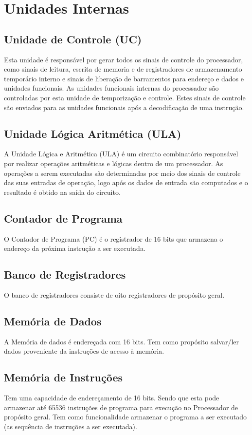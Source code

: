 \documentclass{article}
\begin{document}
    \section{Unidades Internas}
    
    \subsection{Unidade de Controle (UC)}
    Esta unidade é responsável por gerar todos os sinais de controle do processador, como  sinais  de  leitura,  escrita  de  memoria  e  de  registradores  de  armazenamento temporário  interno  e  sinais  de  liberação  de  barramentos  para  endereço  e  dados  e unidades  funcionais.  As  unidades  funcionais  internas  do  processador  são  controladas por esta unidade de temporização e controle. Estes sinais de controle são enviados para as unidades funcionais após a decodificação de uma instrução.

    \subsection{Unidade Lógica Aritmética (ULA)}
    A Unidade Lógica e Aritmética (ULA) é um circuito combinatório responsável por realizar operações aritméticas e lógicas dentro de um processador. As operações a serem executadas são determinadas por meio dos sinais de controle das suas entradas de operação, logo após os dados de entrada são computados e o resultado é obtido na saída do circuito.
    
    
    \subsection{Contador de Programa}
    O Contador de Programa (PC) é o registrador de 16 bits que armazena o endereço da próxima instrução a ser executada.
    
    \subsection{Banco de Registradores}
    O banco de registradores consiste de oito registradores de propósito geral.
    
    \subsection{Memória de Dados}
    A Memória de dados é endereçada com 16 bits. Tem como propósito salvar/ler dados proveniente da instruções de acesso à memória.
    
    \subsection{Memória de Instruções}
    Tem uma capacidade de endereçamento de 16 bits. Sendo que esta pode armazenar até 65536 instruções de programa para execução no Processador de propósito geral. Tem como funcionalidade armazenar o programa a ser executado (as sequência de instruções a ser executada).
    
    
% 
% 
\end{document}
